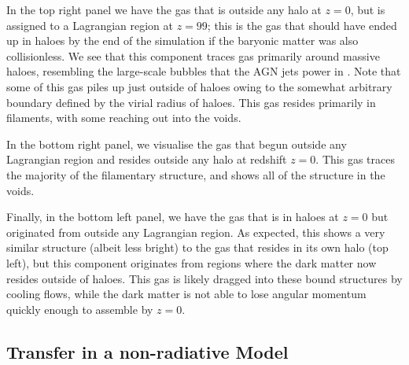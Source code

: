In the top right panel we have the gas that is outside any halo at $z=0$, but
is assigned to a Lagrangian region at $z=99$; this is the gas that should
have ended up in haloes by the end of the simulation if the baryonic matter
was also collisionless. We see that this component traces gas primarily
around massive haloes, resembling the large-scale bubbles that the AGN jets
power in \simba{} \citep{Dave2019}. Note that some of this gas piles up just
outside of haloes owing to the somewhat arbitrary boundary defined by the
virial radius of haloes. This gas resides primarily in filaments, with some
reaching out into the voids.

In the bottom right panel, we visualise the gas that begun outside any
Lagrangian region and resides outside any halo at redshift $z=0$. This gas
traces the majority of the filamentary structure, and shows all of the
structure in the voids. 

Finally, in the bottom left panel, we have the gas that is in haloes at $z=0$
but originated from outside any Lagrangian region. As expected, this shows a
very similar structure (albeit less bright) to the gas that resides in its
own halo (top left), but this component originates from regions where the
dark matter now resides outside of haloes. This gas is likely dragged into
these bound structures by cooling flows, while the dark matter
is not able to lose angular momentum quickly enough to assemble by $z=0$.

\subsection{Transfer in a non-radiative Model}


